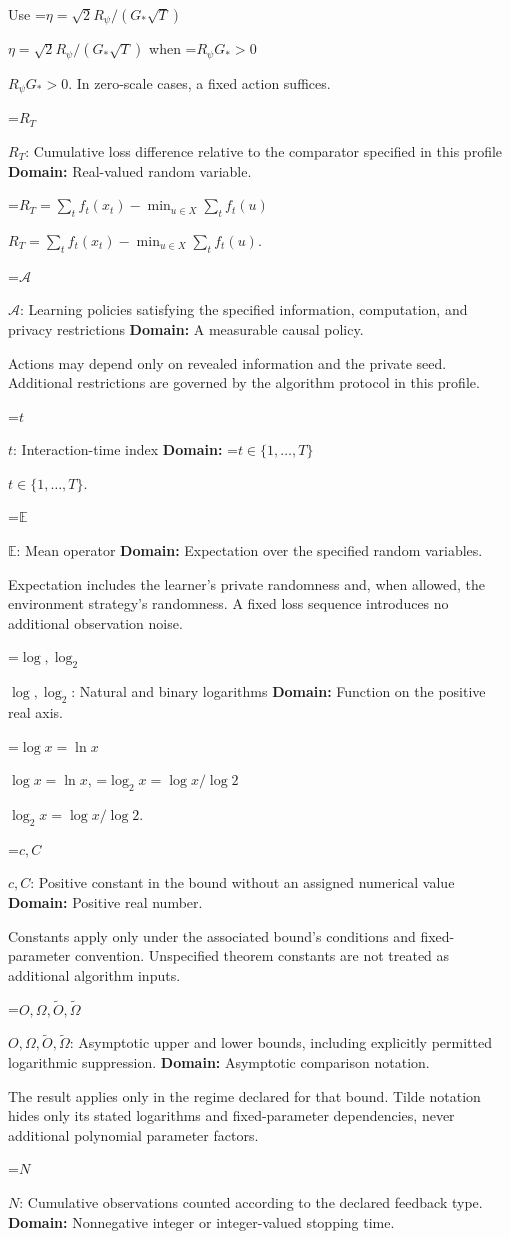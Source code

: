 \documentclass[10pt,a4paper]{article}
\newcommand{\AtlasMath}[1]{\par\begingroup\centering\setbox0=\hbox{$\displaystyle #1$}\ifdim\wd0>1.4\linewidth\typeout{ATLAS WIDE FORMULA: \the\wd0}\fi\ifdim\wd0>\linewidth\resizebox{\linewidth}{!}{\box0}\else\box0\fi\par\endgroup}
\newcommand{\AtlasInlineMath}[1]{\begingroup\setbox0=\hbox{$#1$}\ifdim\wd0>.4\linewidth\endgroup\AtlasMath{#1}\else\endgroup$#1$\fi}
\begin{document}
Use \AtlasInlineMath{\eta=\sqrt2R_\psi/(G_*\sqrt T)} when \AtlasInlineMath{R_\psi G_*>0}. In zero-scale cases, a fixed action suffices.

\AtlasInlineMath{R_T}: Cumulative loss difference relative to the comparator specified in this profile \textbf{Domain:} Real-valued random variable.

\AtlasInlineMath{R_T=\sum_tf_t(x_t)-\min_{u\in X}\sum_tf_t(u)}.

\AtlasInlineMath{\mathcal A}: Learning policies satisfying the specified information, computation, and privacy restrictions \textbf{Domain:} A measurable causal policy.

Actions may depend only on revealed information and the private seed. Additional restrictions are governed by the algorithm protocol in this profile.

\AtlasInlineMath{t}: Interaction-time index \textbf{Domain:} \AtlasInlineMath{t\in\{1,\ldots,T\}}.

\AtlasInlineMath{\mathbb E}: Mean operator \textbf{Domain:} Expectation over the specified random variables.

Expectation includes the learner's private randomness and, when allowed, the environment strategy's randomness. A fixed loss sequence introduces no additional observation noise.

\AtlasInlineMath{\log,\log_2}: Natural and binary logarithms \textbf{Domain:} Function on the positive real axis.

\AtlasInlineMath{\log x=\ln x}, \AtlasInlineMath{\log_2x=\log x/\log2}.

\AtlasInlineMath{c,C}: Positive constant in the bound without an assigned numerical value \textbf{Domain:} Positive real number.

Constants apply only under the associated bound’s conditions and fixed-parameter convention. Unspecified theorem constants are not treated as additional algorithm inputs.

\AtlasInlineMath{O,\Omega,\widetilde O,\widetilde\Omega}: Asymptotic upper and lower bounds, including explicitly permitted logarithmic suppression. \textbf{Domain:} Asymptotic comparison notation.

The result applies only in the regime declared for that bound. Tilde notation hides only its stated logarithms and fixed-parameter dependencies, never additional polynomial parameter factors.

\AtlasInlineMath{N}: Cumulative observations counted according to the declared feedback type. \textbf{Domain:} Nonnegative integer or integer-valued stopping time.
\end{document}
